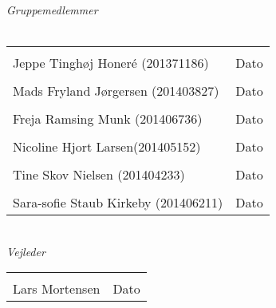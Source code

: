 \begin{vplace}[0.6]
{\large \textit{Gruppemedlemmer}}
\\
\\

\noindent \begin{tabular}{ll}
	\makebox[3.0in]{\hrulefill} & \makebox[1.5in]{\hrulefill}\\
	Jeppe Tinghøj Honeré (201371186) & Dato\\[8ex]%
	\makebox[3in]{\hrulefill} & \makebox[1.5in]{\hrulefill}\\
	Mads Fryland J\o rgersen (201403827) & Dato\\[8ex]
	\makebox[3in]{\hrulefill} & \makebox[1.5in]{\hrulefill}\\
	Freja Ramsing Munk (201406736) & Dato\\[8ex]
	\makebox[3in]{\hrulefill} & \makebox[1.5in]{\hrulefill}\\
	Nicoline Hjort Larsen(201405152) & Dato\\[8ex]
	\makebox[3in]{\hrulefill} & \makebox[1.5in]{\hrulefill}\\
	Tine Skov Nielsen (201404233) & Dato\\[8ex]
	\makebox[3in]{\hrulefill} & \makebox[1.5in]{\hrulefill}\\
	Sara-sofie Staub Kirkeby (201406211) & Dato\\[8ex]
	
\end{tabular}
\\
{\large \textit{Vejleder}}
\\[8ex]
\noindent \begin{tabular}{ll}
	\makebox[3.0in]{\hrulefill} & \makebox[1.5in]{\hrulefill}\\
	Lars Mortensen & Dato\\[8ex]
\end{tabular}
\end{vplace}
